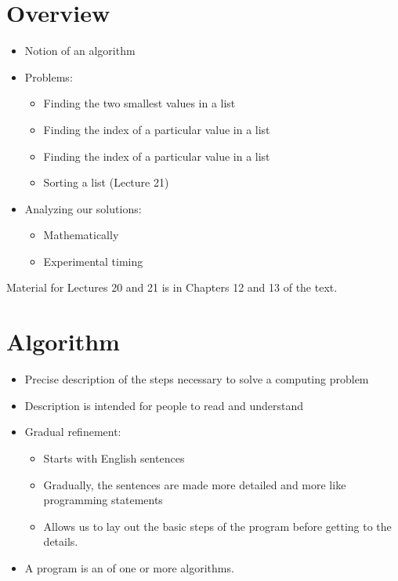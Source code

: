 \documentclass[letterpaper,10pt,english]{sphinxmanual}
\begin{document}
\section{Overview}
\label{\detokenize{lecture_notes/lec20_searching:overview}}\begin{itemize}
\item {} 
Notion of an algorithm

\item {} 
Problems:
\begin{itemize}
\item {} 
Finding the two smallest values in a list

\item {} 
Finding the index of a particular value in a list

\item {} 
Finding the index of a particular value in a  list

\item {} 
Sorting a list (Lecture 21)

\end{itemize}

\item {} 
Analyzing our solutions:
\begin{itemize}
\item {} 
Mathematically

\item {} 
Experimental timing

\end{itemize}

\end{itemize}

Material for Lectures 20 and 21 is in Chapters 12 and 13 of the text.


\section{Algorithm}
\label{\detokenize{lecture_notes/lec20_searching:algorithm}}\begin{itemize}
\item {} 
Precise description of the steps necessary to solve a computing
problem

\item {} 
Description is intended for people to read and understand

\item {} 
Gradual refinement:
\begin{itemize}
\item {} 
Starts with English sentences

\item {} 
Gradually, the sentences are made more detailed and more like
programming statements

\item {} 
Allows us to lay out the basic steps of the program before getting
to the details.

\end{itemize}

\item {} 
A program is an  of one or more algorithms.

\end{itemize}
\end{document}
